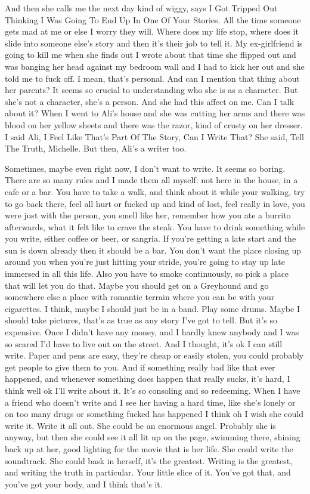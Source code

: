 \documentclass[
]{memoir}
\begin{document}
And then she calls me the next day kind of wiggy, says I Got Tripped Out
Thinking I Was Going To End Up In One Of Your Stories. All the time
someone gets mad at me or else I worry they will. Where does my life
stop, where does it slide into someone else's story and then it's their
job to tell it. My ex-girlfriend is going to kill me when she finds out
I wrote about that time she flipped out and was banging her head against
my bedroom wall and I had to kick her out and she told me to fuck off. I
mean, that's personal. And can I mention that thing about her parents?
It seems so crucial to understanding who she is as a character. But
she's not a character, she's a person. And she had this affect on me.
Can I talk about it? When I went to Ali's house and she was cutting her
arms and there was blood on her yellow sheets and there was the razor,
kind of crusty on her dresser. I said Ali, I Feel Like That's Part Of
The Story, Can I Write That? She said, Tell The Truth, Michelle. But
then, Ali's a writer too.

Sometimes, maybe even right now, I don't want to write. It seems so
boring. There are so many rules and I made them all myself: not here in
the house, in a cafe or a bar. You have to take a walk, and think about
it while your walking, try to go back there, feel all hurt or fucked up
and kind of lost, feel really in love, you were just with the person,
you smell like her, remember how you ate a burrito afterwards, what it
felt like to crave the steak. You have to drink something while you
write, either coffee or beer, or sangria. If you're getting a late start
and the sun is down already then it should be a bar. You don't want the
place closing up around you when you're just hitting your stride, you're
going to stay up late immersed in all this life. Also you have to smoke
continuously, so pick a place that will let you do that. Maybe you
should get on a Greyhound and go somewhere else a place with romantic
terrain where you can be with your cigarettes. I think, maybe I should
just be in a band. Play some drums. Maybe I should take pictures, that's
as true as any story I've got to tell. But it's so expensive. Once I
didn't have any money, and I hardly knew anybody and I was so scared I'd
have to live out on the street. And I thought, it's ok I can still
write. Paper and pens are easy, they're cheap or easily stolen, you
could probably get people to give them to you. And if something really
bad like that ever happened, and whenever something does happen that
really sucks, it's hard, I think well ok I'll write about it. It's so
consoling and so redeeming. When I have a friend who doesn't write and I
see her having a hard time, like she's lonely or on too many drugs or
something fucked has happened I think oh I wish she could write it.
Write it all out. She could be an enormous angel. Probably she is
anyway, but then she could see it all lit up on the page, swimming
there, shining back up at her, good lighting for the movie that is her
life. She could write the soundtrack. She could bask in herself, it's
the greatest. Writing is the greatest, and writing the truth in
particular. Your little slice of it. You've got that, and you've got
your body, and I think that's it.

~

\end{document}
